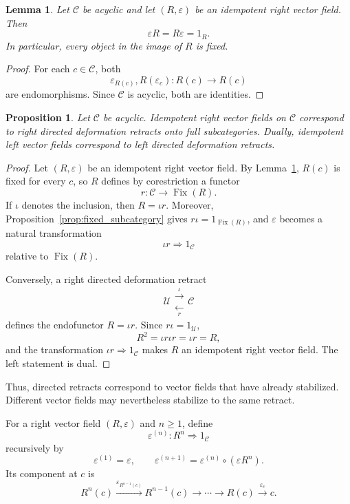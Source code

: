 \documentclass[12pt]{amsart}
\newtheorem{lemma}[teo]{Lemma}
\newtheorem{proposition}[teo]{Proposition}
\theoremstyle{definition}
\theoremstyle{remark}
\numberwithin{figure}{section}%
\newcommand{\CC}{\mathcal{C}}
\newcommand{\Uc}{\mathcal{U}}
\begin{document}
\begin{lemma}\label{lem:idempotent_field_normalized}
Let \(\CC\) be acyclic and let
\((R,\varepsilon)\) be an idempotent right vector field. Then
\[
\varepsilon R=R\varepsilon=1_R.
\]
In particular, every object in the image of \(R\) is fixed.
\end{lemma}

\begin{proof}
For each \(c\in\CC\), both
\[
\varepsilon_{R(c)},R(\varepsilon_c)\colon R(c)\longrightarrow R(c)
\]
are endomorphisms. Since \(\CC\) is acyclic, both are identities.
\end{proof}

\begin{proposition}\label{prop:idempotent_fields_retracts}
Let \(\CC\) be acyclic. Idempotent right vector fields on \(\CC\)
correspond to right directed deformation retracts onto full
subcategories. Dually, idempotent left vector fields correspond to left
directed deformation retracts.
\end{proposition}

\begin{proof}
Let \((R,\varepsilon)\) be an idempotent right vector field. By
Lemma~\ref{lem:idempotent_field_normalized}, \(R(c)\) is fixed for every
\(c\), so \(R\) defines by corestriction a functor
\[
r\colon\CC\longrightarrow\operatorname{Fix}(R).
\]
If \(\iota\) denotes the inclusion, then
\(R=\iota r\). Moreover, Proposition~\ref{prop:fixed_subcategory} gives
\(r\iota=1_{\operatorname{Fix}(R)}\), and \(\varepsilon\) becomes a
natural transformation
\[
\iota r\Rightarrow1_\CC
\]
relative to \(\operatorname{Fix}(R)\).

Conversely, a right directed deformation retract
\[
\Uc
\mathrel{\substack{\xrightarrow{\iota}\\[-1mm]\xleftarrow[r]{}}}
\CC
\]
defines the endofunctor \(R=\iota r\). Since \(r\iota=1_\Uc\),
\[
R^2=\iota r\iota r=\iota r=R,
\]
and the transformation \(\iota r\Rightarrow1_\CC\) makes \(R\) an
idempotent right vector field. The left statement is dual.
\end{proof}

Thus, directed retracts correspond to vector fields that have already
stabilized. Different vector fields may nevertheless stabilize to the
same retract.

For a right vector field \((R,\varepsilon)\) and \(n\geq1\), define
\[
\varepsilon^{(n)}\colon R^n\Rightarrow1_\CC
\]
recursively by
\[
\varepsilon^{(1)}=\varepsilon,
\qquad
\varepsilon^{(n+1)}
=
\varepsilon^{(n)}\circ(\varepsilon R^n).
\]
Its component at \(c\) is
\[
R^n(c)
\xrightarrow{\varepsilon_{R^{n-1}(c)}}
R^{n-1}(c)
\longrightarrow\cdots\longrightarrow
R(c)
\xrightarrow{\varepsilon_c}
c.
\]
\end{document}
